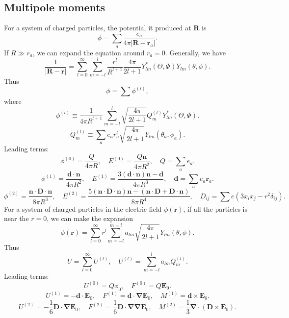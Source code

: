 \subsection{Multipole moments}
For a system of charged particles, the potential it produced at $\bm{R}$ is
\[\phi = \sum_a \frac{e_a}{4\pi|\bm{R} - \bm{r}_a|}.\]
If $R \gg r_a$, we can expand the equation around $r_a=0$. Generally, we have
\[\frac{1}{|\bm{R} - \bm{r}|} = \sum_{l=0}^{\infty} \sum_{m=-l}^{l} \frac{r^l}{R^{l+1}} \frac{4\pi}{2l+1} Y^*_{lm}(\Theta,\Phi)Y_{lm}(\theta,\phi).\]
Thus
\[\phi = \sum \phi^{(l)},\]
where
\[\phi^{(l)} \equiv \frac{1}{4\pi R^{l+1}} \sum_{m=-l}^{l} \sqrt{\frac{4\pi}{2l+1}} Q_{m}^{(l)} Y^*_{lm}(\Theta,\Phi).\]
\[Q_m^{(l)} \equiv \sum_a e_a r_a^l \sqrt{\frac{4\pi}{2l+1}} Y_{lm}(\theta_a,\phi_a).\]
Leading terms: 
\[\phi^{(0)} = \frac{Q}{4\pi R} , \quad E^{(0)} = \frac{Q\bm{n}}{4\pi R^2} , \quad Q = \sum_a e_a.\]
\[\phi^{(1)} = \frac{\bm{d} \cdot \bm{n}}{4\pi R^2}  , \quad E^{(1)} = \frac{3(\bm{d}\cdot\bm{n})\bm{n}-\bm{d}}{4\pi R^3} , \quad \bm{d} = \sum_a e_a \bm{r}_a.\]
\[\phi^{(2)} = \frac{\bm{n} \cdot \bm{D} \cdot \bm{n}}{8\pi R^3} , \quad E^{(2)} = \frac{5(\bm{n} \cdot \bm{D} \cdot \bm{n})\bm{n} - (\bm{n} \cdot \bm{D} + \bm{D} \cdot \bm{n})}{8\pi R^4} , \quad D_{ij} = \sum e(3x_ix_j-r^2\delta_{ij}).\]
For a system of charged particles in the electric field $\phi(\bm{r})$, if all the particles is near the $r=0$, we can make the expansion
\[\phi(\bm{r}) = \sum_{l=0}^{\infty} r^l \sum_{m=-l}^{m=l} a_{lm} \sqrt{\frac{4\pi}{2l+1}} Y_{lm}(\theta,\phi).\]
Thus
\[U = \sum_{l=0}^{\infty} U^{(l)} , \quad U^{(l)} = \sum_{m=-l}^{l} a_{lm}Q^{(l)}_m.\]
Leading terms: 
\[U^{(0)} = Q\phi_0 , \quad F^{(0)} = Q\bm{E}_0.\]
\[U^{(1)} = -\bm{d}\cdot \bm{E}_0 , \quad F^{(1)} = \bm{d}\cdot \bm{\nabla}\bm{E}_0 , \quad M^{(1)} = \bm{d} \times \bm{E}_0.\]
\[U^{(2)} = -\frac{1}{6}\bm{D}\cdot \bm{\nabla}\bm{E}_0 , \quad F^{(2)} = \frac{1}{6} \bm{D}\cdot \bm{\nabla}\bm{\nabla}\bm{E}_0 , \quad M^{(2)} = \frac{1}{3} \bm{\nabla} \cdot (\bm{D} \times \bm{E}_0).\]

